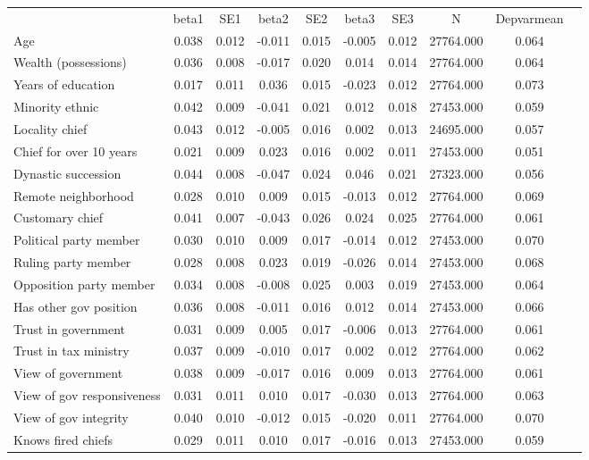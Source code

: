 {\def\sym#1{\ifmmode^{#1}\else\(^{#1}\)\fi} \begin{tabular}{l*{9}{c}} \hline\hline 
& beta1 & SE1 & beta2 & SE2 & beta3 & SE3 & N & Depvarmean \\
Age & 0.038 & 0.012 & -0.011 & 0.015 & -0.005 & 0.012 & 27764.000 & 0.064 \\
Wealth (possessions) & 0.036 & 0.008 & -0.017 & 0.020 & 0.014 & 0.014 & 27764.000 & 0.064 \\
Years of education & 0.017 & 0.011 & 0.036 & 0.015 & -0.023 & 0.012 & 27764.000 & 0.073 \\
Minority ethnic & 0.042 & 0.009 & -0.041 & 0.021 & 0.012 & 0.018 & 27453.000 & 0.059 \\
Locality chief & 0.043 & 0.012 & -0.005 & 0.016 & 0.002 & 0.013 & 24695.000 & 0.057 \\
Chief for over 10 years & 0.021 & 0.009 & 0.023 & 0.016 & 0.002 & 0.011 & 27453.000 & 0.051 \\
Dynastic succession & 0.044 & 0.008 & -0.047 & 0.024 & 0.046 & 0.021 & 27323.000 & 0.056 \\
Remote neighborhood & 0.028 & 0.010 & 0.009 & 0.015 & -0.013 & 0.012 & 27764.000 & 0.069 \\
Customary chief & 0.041 & 0.007 & -0.043 & 0.026 & 0.024 & 0.025 & 27764.000 & 0.061 \\
Political party member & 0.030 & 0.010 & 0.009 & 0.017 & -0.014 & 0.012 & 27453.000 & 0.070 \\
Ruling party member & 0.028 & 0.008 & 0.023 & 0.019 & -0.026 & 0.014 & 27453.000 & 0.068 \\
Opposition party member & 0.034 & 0.008 & -0.008 & 0.025 & 0.003 & 0.019 & 27453.000 & 0.064 \\
Has other gov position & 0.036 & 0.008 & -0.011 & 0.016 & 0.012 & 0.014 & 27453.000 & 0.066 \\
Trust in government & 0.031 & 0.009 & 0.005 & 0.017 & -0.006 & 0.013 & 27764.000 & 0.061 \\
Trust in tax ministry & 0.037 & 0.009 & -0.010 & 0.017 & 0.002 & 0.012 & 27764.000 & 0.062 \\
View of government & 0.038 & 0.009 & -0.017 & 0.016 & 0.009 & 0.013 & 27764.000 & 0.061 \\
View of gov responsiveness & 0.031 & 0.011 & 0.010 & 0.017 & -0.030 & 0.013 & 27764.000 & 0.063 \\
View of gov integrity & 0.040 & 0.010 & -0.012 & 0.015 & -0.020 & 0.011 & 27764.000 & 0.070 \\
Knows fired chiefs & 0.029 & 0.011 & 0.010 & 0.017 & -0.016 & 0.013 & 27453.000 & 0.059 \\

\end{tabular}}
